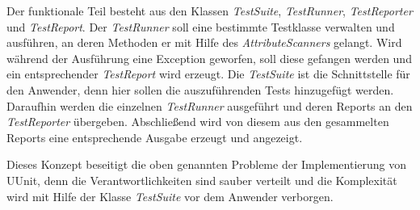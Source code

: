 Der funktionale Teil besteht aus den Klassen \textit{TestSuite}, \textit{TestRunner}, \textit{TestReporter} und \textit{TestReport}. Der \textit{TestRunner} soll eine bestimmte Testklasse verwalten und ausführen, an deren Methoden er mit Hilfe des \textit{AttributeScanners} gelangt. Wird während der Ausführung eine Exception geworfen, soll diese gefangen werden und ein entsprechender \textit{TestReport} wird erzeugt. Die \textit{TestSuite} ist die Schnittstelle für den Anwender, denn hier sollen die auszuführenden Tests hinzugefügt werden. Daraufhin werden die einzelnen \textit{TestRunner} ausgeführt und deren Reports an den \textit{TestReporter} übergeben. Abschließend wird von diesem aus den gesammelten Reports eine entsprechende Ausgabe erzeugt und angezeigt.

Dieses Konzept beseitigt die oben genannten Probleme der Implementierung von UUnit, denn die Verantwortlichkeiten sind sauber verteilt und die Komplexität wird mit Hilfe der Klasse \textit{TestSuite} vor dem Anwender verborgen.
